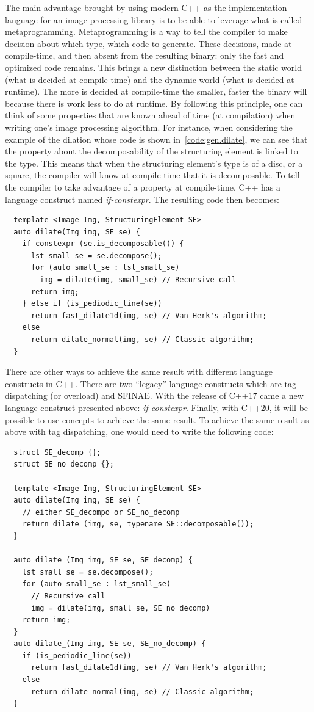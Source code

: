 The main advantage brought by using modern C++ as the implementation language for an image processing library is to be
able to leverage what is called metaprogramming. Metaprogramming is a way to tell the compiler to make decision about
which type, which code to generate. These decisions, made at compile-time, and then absent from the resulting binary:
only the fast and optimized code remains. This brings a new distinction between the static world (what is decided at
compile-time) and the dynamic world (what is decided at runtime). The more is decided at compile-time the smaller,
faster the binary will because there is work less to do at runtime. By following this principle, one can think of some
properties that are known ahead of time (at compilation) when writing one's image processing algorithm. For instance,
when considering the example of the dilation whose code is shown in~\cref{code:gen.dilate}, we can see that the property
about the decomposability of the structuring element is linked to the type. This means that when the structuring
element's type is of a disc, or a square, the compiler will know at compile-time that it is decomposable. To tell the
compiler to take advantage of a property at compile-time, C++ has a language construct named \emph{if-constexpr}. The
resulting code then becomes:

\begin{verbatim}
  template <Image Img, StructuringElement SE>
  auto dilate(Img img, SE se) {
    if constexpr (se.is_decomposable()) {
      lst_small_se = se.decompose();
      for (auto small_se : lst_small_se)
        img = dilate(img, small_se) // Recursive call
      return img;
    } else if (is_pediodic_line(se))
      return fast_dilate1d(img, se) // Van Herk's algorithm;
    else
      return dilate_normal(img, se) // Classic algorithm;
  }
\end{verbatim}

There are other ways to achieve the same result with different language constructs in C++. There are two ``legacy''
language constructs which are tag dispatching (or overload) and SFINAE. With the release of C++17 came a new language
construct presented above: \emph{if-constexpr}. Finally, with C++20, it will be possible to use concepts to achieve the
same result. To achieve the same result as above with tag dispatching, one would need to write the following code:

\begin{verbatim}
  struct SE_decomp {};
  struct SE_no_decomp {};

  template <Image Img, StructuringElement SE>
  auto dilate(Img img, SE se) {
    // either SE_decompo or SE_no_decomp
    return dilate_(img, se, typename SE::decomposable());
  }

  auto dilate_(Img img, SE se, SE_decomp) {
    lst_small_se = se.decompose();
    for (auto small_se : lst_small_se)
      // Recursive call
      img = dilate(img, small_se, SE_no_decomp)
    return img;
  }
  auto dilate_(Img img, SE se, SE_no_decomp) {
    if (is_pediodic_line(se))
      return fast_dilate1d(img, se) // Van Herk's algorithm;
    else
      return dilate_normal(img, se) // Classic algorithm;
  }
\end{verbatim}

